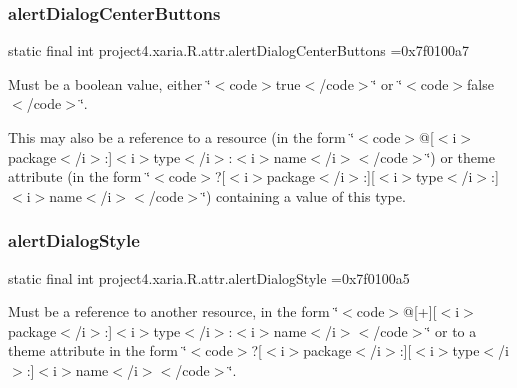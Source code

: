 \subsubsection{\texorpdfstring{alert\+Dialog\+Center\+Buttons}{alertDialogCenterButtons}}
{\footnotesize\ttfamily static final int project4.\+xaria.\+R.\+attr.\+alert\+Dialog\+Center\+Buttons =0x7f0100a7\hspace{0.3cm}{\ttfamily [static]}}

Must be a boolean value, either \char`\"{}$<$code$>$true$<$/code$>$\char`\"{} or \char`\"{}$<$code$>$false$<$/code$>$\char`\"{}. 

This may also be a reference to a resource (in the form \char`\"{}$<$code$>$@\mbox{[}$<$i$>$package$<$/i$>$\+:\mbox{]}$<$i$>$type$<$/i$>$\+:$<$i$>$name$<$/i$>$$<$/code$>$\char`\"{}) or theme attribute (in the form \char`\"{}$<$code$>$?\mbox{[}$<$i$>$package$<$/i$>$\+:\mbox{]}\mbox{[}$<$i$>$type$<$/i$>$\+:\mbox{]}$<$i$>$name$<$/i$>$$<$/code$>$\char`\"{}) containing a value of this type. \mbox{\label{classproject4_1_1xaria_1_1R_1_1attr_a88cfd168b968d5f4bf3679115d6c54f6}} 
\subsubsection{\texorpdfstring{alert\+Dialog\+Style}{alertDialogStyle}}
{\footnotesize\ttfamily static final int project4.\+xaria.\+R.\+attr.\+alert\+Dialog\+Style =0x7f0100a5\hspace{0.3cm}{\ttfamily [static]}}

Must be a reference to another resource, in the form \char`\"{}$<$code$>$@\mbox{[}+\mbox{]}\mbox{[}$<$i$>$package$<$/i$>$\+:\mbox{]}$<$i$>$type$<$/i$>$\+:$<$i$>$name$<$/i$>$$<$/code$>$\char`\"{} or to a theme attribute in the form \char`\"{}$<$code$>$?\mbox{[}$<$i$>$package$<$/i$>$\+:\mbox{]}\mbox{[}$<$i$>$type$<$/i$>$\+:\mbox{]}$<$i$>$name$<$/i$>$$<$/code$>$\char`\"{}. \mbox{\label{classproject4_1_1xaria_1_1R_1_1attr_a588b089db6e4e10fbc317263059bb6f1}} 
